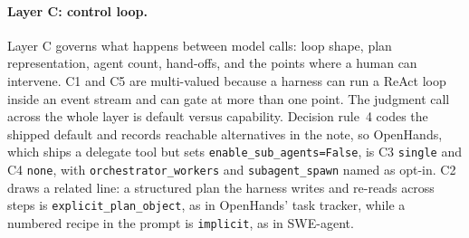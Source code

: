 \paragraph{Layer C: control loop.}\label{subsec:layer-c}
Layer C governs what happens between model calls: loop shape, plan representation, agent count,
hand-offs, and the points where a human can intervene. C1 and C5 are multi-valued because a harness can
run a ReAct loop inside an event stream and can gate at more than one point. The judgment call across the
whole layer is default versus capability. Decision rule~4 codes the shipped default and records
reachable alternatives in the note, so OpenHands, which ships a delegate tool but sets
\texttt{enable\_sub\_agents=False}, is C3 \texttt{single} and C4 \texttt{none}, with
\texttt{orchestrator\_workers} and \texttt{subagent\_spawn} named as opt-in. C2 draws a related line: a
structured plan the harness writes and re-reads across steps is \texttt{explicit\_plan\_object}, as in
OpenHands' task tracker, while a numbered recipe in the prompt is \texttt{implicit}, as in SWE-agent.

